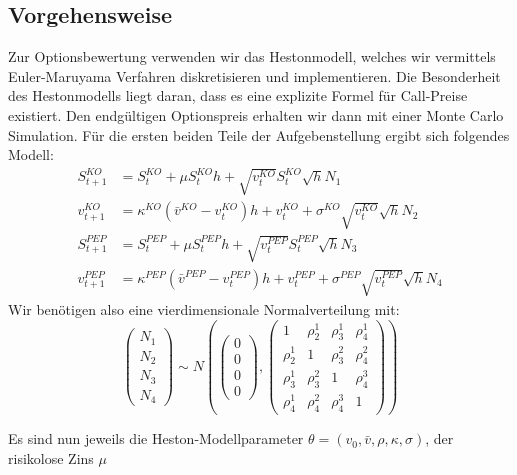 \documentclass[12pt]{article}
\begin{document}
\subsection*{Vorgehensweise}
Zur Optionsbewertung verwenden wir das Hestonmodell, welches wir vermittels Euler-Maruyama Verfahren diskretisieren und implementieren. Die Besonderheit des Hestonmodells liegt daran, dass es eine explizite Formel für Call-Preise existiert. Den endgültigen Optionspreis erhalten wir dann mit einer Monte Carlo Simulation. Für die ersten beiden Teile der Aufgebenstellung ergibt sich folgendes Modell:
\begin{align*}
S^{KO}_{t+1}&=S^{KO}_{t}+\mu S^{KO}_{t}h+\sqrt{v^{KO}_t}S^{KO}_{t}\sqrt{h}N_1\\
v^{KO}_{t+1}&=\kappa^{KO}(\bar{v}^{KO}-v^{KO}_t)h+v^{KO}_t+\sigma^{KO}\sqrt{v^{KO}_t}\sqrt{h}N_2\\
S^{PEP}_{t+1}&=S^{PEP}_{t}+\mu S^{PEP}_{t}h+\sqrt{v^{PEP}_t}S^{PEP}_{t}\sqrt{h}N_3\\
v^{PEP}_{t+1}&=\kappa^{PEP}(\bar{v}^{PEP}-v^{PEP}_t)h+v^{PEP}_t+\sigma^{PEP}\sqrt{v^{PEP}_t}\sqrt{h}N_4
\end{align*}
Wir benötigen also eine vierdimensionale Normalverteilung mit:
\begin{equation*}
\left({\begin{array}{c} N_1\\ N_2\\ N_3\\ N_4\end{array}}\right) \sim N\left(\left({\begin{array}{c} 0 \\ 0 \\ 0 \\ 0 \end{array}}\right),\left({\begin{array}{cccc} 1 & \rho^1_2 & \rho^1_3 & \rho^1_4\\ \rho^1_2 & 1 & \rho^2_3 & \rho^2_4 \\ \rho^1_3 & \rho^2_3 & 1 & \rho^3_4 \\ \rho^1_4 & \rho^2_4 & \rho^3_4 & 1 \end{array}}\right)\right)
\end{equation*}

Es sind nun jeweils die Heston-Modellparameter $\theta=(v_0,\bar v, \rho, \kappa, \sigma)$, der risikolose Zins $\mu$ 
\end{document}
